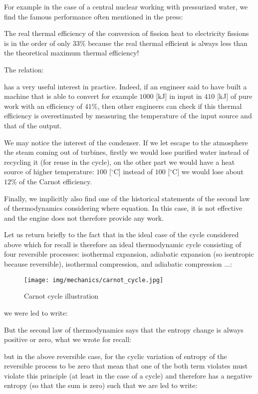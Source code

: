 	For example in the case of a central nuclear working with pressurized water, we find the famous performance often mentioned in the press:
	
	The real thermal efficiency of the conversion of fission heat to electricity fissions is in the order of only $33\%$ because the real thermal efficient is always less than the theoretical maximum thermal efficiency!

	The relation:
	
	has a very useful interest in practice. Indeed, if an engineer said to have built a machine that is able to convert for example $1000$ [kJ] in input in $410$ [kJ] of pure work with an efficiency of $41\%$, then other engineers can check if this thermal efficiency is overestimated by measuring the temperature of the input source and that of the output.
	\begin{tcolorbox}[title=Remark,colframe=black,arc=10pt]
	We may notice the interest of the condenser. If we let escape to the atmosphere the steam coming out of turbines, firstly we would lose purified water instead of recycling it (for reuse in the cycle), on the other part we would have a heat source of higher temperature: $100$ [$^\circ$C] instead of $100$ [$^\circ$C] we would lose about $12\%$ of the Carnot efficiency.
	\end{tcolorbox}
	Finally, we implicitly also find one of the historical statements of the second law of thermodynamics considering where equation. In this case, it is not effective and the engine does not therefore provide any work.

	Let us return briefly to the fact that in the ideal case of the cycle considered above which for recall is therefore an ideal thermodynamic cycle consisting of four reversible processes: isothermal expansion, adiabatic expansion (so isentropic because reversible), isothermal compression, and adiabatic compression ...:
	\begin{figure}[H]
		\centering
		\texttt{[image: img/mechanics/carnot\_cycle.jpg]}
		\caption{Carnot cycle illustration}
	\end{figure}
		
	we were led to write:
	
	But the second law of thermodynamics says that the entropy change is always positive or zero, what we wrote for recall:
	
	but in the above reversible case, for the cyclic variation of entropy of the reversible process to be zero that mean that one of the both term violates must violate this principle (at least in the case of a cycle) and therefore has a negative entropy (so that the sum is zero) such that we are led to write:
	
